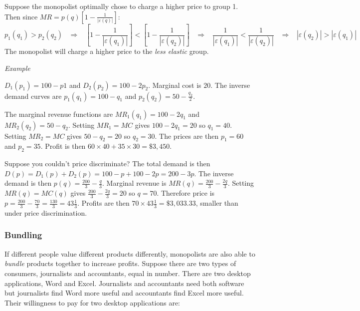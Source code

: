 \documentclass{article}
\begin{document}
Suppose the monopolist optimally chose to charge a higher price to group 1. Then since $MR=p\left( q \right)\left[ 1-\frac{1}{\left| \varepsilon\left( q \right) \right|} \right]$:
\[
  p_1\left( q_1 \right)>p_2\left( q_2 \right) \;\;\;\Longrightarrow\;\;\;
  \left[ 1-\frac{1}{\left| \varepsilon\left( q_1 \right) \right|} \right]<
  \left[ 1-\frac{1}{\left| \varepsilon\left( q_2 \right) \right|} \right]
  \;\;\;\Longrightarrow\;\;\;
  \frac{1}{\left| \varepsilon\left( q_1 \right) \right|}< \frac{1}{\left| \varepsilon\left( q_2 \right) \right|}
  \;\;\;\Longrightarrow\;\;\;
  \left| \varepsilon\left( q_2 \right) \right|>\left| \varepsilon\left( q_1 \right) \right|
\]
The monopolist will charge a higher price to the \emph{less elastic} group.

\medskip
\par\noindent\emph{Example}\par
$D_1\left( p_1 \right)=100-p1$ and $D_2\left( p_2 \right)=100-2p_2$. Marginal cost is $20$. The inverse demand curves are $p_1\left( q_1 \right)=100-q_1$ and $p_2\left( q_2 \right)=50-\frac{q_2}{2}$.

The marginal revenue functions are $MR_1\left( q_1 \right)=100-2q_1$ and $MR_2\left(q_2  \right)=50-q_2$. Setting $MR_1=MC$ gives $100-2q_1=20$ so $q_1=40$. Setting $MR_2=MC$ gives $50-q_2=20$ so $q_2=30$. The prices are then $p_1=60$ and $p_2=35$. Profit is then $60\times 40 + 35 \times 30 = \$3,450$.

Suppose you couldn't price discriminate? The total demand is then $D\left( p \right)=D_1\left( p \right)+D_2\left( p \right)=100-p + 100- 2p = 200 - 3p$. The inverse demand is then $p\left( q \right)=\frac{200}{3}-\frac{q}{3}$. Marginal revenue is $MR\left( q \right)=\frac{200}{3}-\frac{2q}{3}$. Setting $MR\left( q \right)=MC\left( q \right)$ gives $\frac{200}{3}-\frac{2q}{3}=20$ so $q=70$. Therefore price is $p=\frac{200}{3}-\frac{70}{3}=\frac{130}{3}=43\frac{1}{3}$. Profits are then $70\times 43\frac{1}{3}=\$3,033.33$, smaller than under price discrimination.
\subsubsection*{Bundling}
If different people value different products differently, monopolists are also able to \emph{bundle} products together to increase profits. Suppose there are two types of consumers, journalists and accountants, equal in number. There are two desktop applications, Word and Excel. Journalists and accountants need both software but journalists find Word more useful and accountants find Excel more useful. Their willingness to pay for two desktop applications are:
\end{document}
